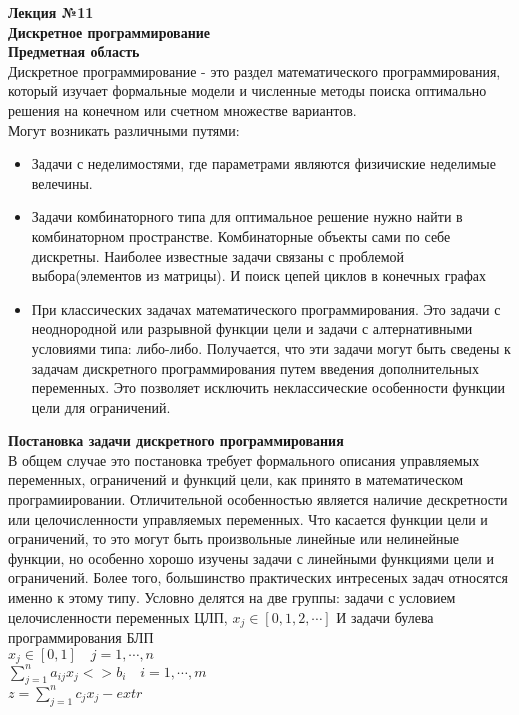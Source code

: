 

\LARGE{ \textbf {Лекция №11}}\\
\Large{ \textbf {Дискретное программирование}}\\

\textbf{Предметная область}\\
Дискретное программирование - это раздел математического программирования, который изучает формальные модели
и численные методы поиска оптимально решения на конечном или счетном множестве вариантов. \\

Могут возникать различными путями:
\begin{itemize}
  \item Задачи с неделимостями, где параметрами являются физичиские неделимые велечины.
  \item Задачи комбинаторного типа для оптимальное решение нужно найти в комбинаторном пространстве.
   Комбинаторные объекты сами по себе дискретны.
   Наиболее известные задачи связаны с проблемой выбора(элементов из матрицы). И поиск цепей циклов в конечных графах
   \item При классических задачах математического программирования.
   Это задачи с неоднородной или разрывной функции цели и задачи с алтернативными условиями типа: либо-либо.
   Получается, что эти задачи могут быть сведены к задачам дискретного программирования путем введения дополнительных переменных.
   Это позволяет исключить неклассические особенности функции цели для ограничений.
\end{itemize}

\textbf{Постановка задачи дискретного программирования}\\

В общем случае это постановка требует формального описания управляемых переменных,
 ограничений и функций цели, как принято в математическом програмиировании.
Отличительной особенностью является наличие дескретности или целочисленности управляемых переменных.
Что касается функции цели и ограничений, то это могут быть произвольные линейные или нелинейные функции,
но особенно хорошо изучены задачи с линейными функциями цели и ограничений.
Более того, большинство практических интресеных  задач относятся именно к этому типу.
Условно делятся на две группы: задачи с условием целочисленности переменных ЦЛП, $x_j \in [0,1,2, \cdots]$
И задачи булева программирования БЛП  \\
$x_j \in [0,1] \quad j = 1, \cdots , n$\\
$ \sum \limits_{j =1}^n a_{ij}x_j <> b_i \quad i = 1, \cdots , m$\\
$z = \sum \limits_{j =1}^n c_j x_j - extr $\\

